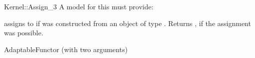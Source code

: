 \begin{ccRefFunctionObjectConcept}{Kernel::Assign_3}
A model for this must provide:


{assigns  to  if 
was constructed from an object of type .
Returns , if the assignment was possible.}

\ccRefines
AdaptableFunctor (with two arguments)

\ccSeeAlso
{} \\
 \\
 \\
  \\

\end{ccRefFunctionObjectConcept}
